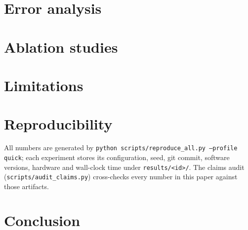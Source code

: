 \documentclass[10pt]{article}
\begin{document}
\section{Error analysis}


\section{Ablation studies}



\section{Limitations}


\section{Reproducibility}
All numbers are generated by \texttt{python scripts/reproduce\_all.py --profile quick}; each experiment
stores its configuration, seed, git commit, software versions, hardware and wall-clock time under
\texttt{results/<id>/}. The claims audit (\texttt{scripts/audit\_claims.py}) cross-checks every number in
this paper against those artifacts.

\section{Conclusion}




\end{document}
